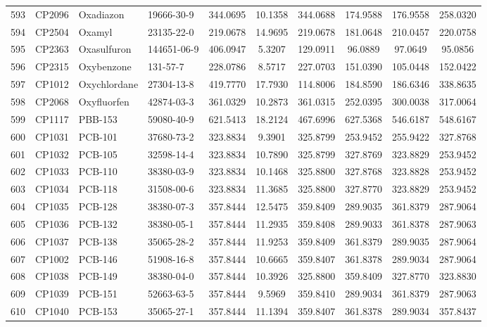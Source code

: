 \begin{longtable}{clllcccccc}
593 & CP2096 & Oxadiazon & 19666-30-9 & 344.0695 & 10.1358 & 344.0688 & 174.9588 & 176.9558 & 258.0320 \\ 
594 & CP2504 & Oxamyl & 23135-22-0 & 219.0678 & 14.9695 & 219.0678 & 181.0648 & 210.0457 & 220.0758 \\ 
595 & CP2363 & Oxasulfuron & 144651-06-9 & 406.0947 & 5.3207 & 129.0911 & 96.0889 & 97.0649 & 95.0856 \\ 
596 & CP2315 & Oxybenzone & 131-57-7 & 228.0786 & 8.5717 & 227.0703 & 151.0390 & 105.0448 & 152.0422 \\ 
597 & CP1012 & Oxychlordane & 27304-13-8 & 419.7770 & 17.7930 & 114.8006 & 184.8590 & 186.6346 & 338.8635 \\ 
598 & CP2068 & Oxyfluorfen & 42874-03-3 & 361.0329 & 10.2873 & 361.0315 & 252.0395 & 300.0038 & 317.0064 \\ 
599 & CP1117 & PBB-153 & 59080-40-9 & 621.5413 & 18.2124 & 467.6996 & 627.5368 & 546.6187 & 548.6167 \\ 
600 & CP1031 & PCB-101 & 37680-73-2 & 323.8834 & 9.3901 & 325.8799 & 253.9452 & 255.9422 & 327.8768 \\ 
601 & CP1032 & PCB-105 & 32598-14-4 & 323.8834 & 10.7890 & 325.8799 & 327.8769 & 323.8829 & 253.9452 \\ 
602 & CP1033 & PCB-110 & 38380-03-9 & 323.8834 & 10.1468 & 325.8800 & 327.8768 & 323.8828 & 253.9452 \\ 
603 & CP1034 & PCB-118 & 31508-00-6 & 323.8834 & 11.3685 & 325.8800 & 327.8770 & 323.8829 & 253.9452 \\ 
604 & CP1035 & PCB-128 & 38380-07-3 & 357.8444 & 12.5475 & 359.8409 & 289.9035 & 361.8379 & 287.9064 \\ 
605 & CP1036 & PCB-132 & 38380-05-1 & 357.8444 & 11.2935 & 359.8408 & 289.9033 & 361.8378 & 287.9063 \\ 
606 & CP1037 & PCB-138 & 35065-28-2 & 357.8444 & 11.9253 & 359.8409 & 361.8379 & 289.9035 & 287.9064 \\ 
607 & CP1002 & PCB-146 & 51908-16-8 & 357.8444 & 10.6665 & 359.8407 & 361.8378 & 289.9034 & 287.9064 \\ 
608 & CP1038 & PCB-149 & 38380-04-0 & 357.8444 & 10.3926 & 325.8800 & 359.8409 & 327.8770 & 323.8830 \\ 
609 & CP1039 & PCB-151 & 52663-63-5 & 357.8444 & 9.5969 & 359.8410 & 289.9034 & 361.8379 & 287.9063 \\ 
610 & CP1040 & PCB-153 & 35065-27-1 & 357.8444 & 11.1394 & 359.8407 & 361.8378 & 289.9034 & 357.8437 \\ 

\end{longtable}
